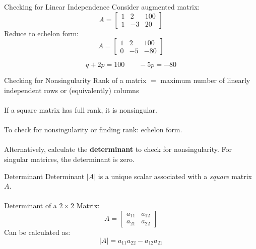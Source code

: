 \documentclass{./../../Latex/teaching_slides}
\begin{document}
\begin{frame}{Checking for Linear Independence}
Consider augmented matrix:
$$ A=\left[\begin{array}{cc|c}1 & 2 & 100 \\ 1 & -3 & 20\end{array}\right] $$
Reduce to echelon form:
$$ A=\left[\begin{array}{cc|c}1 & 2 & 100 \\ 0 & -5 & -80\end{array}\right] $$

$$ q+2p = 100 \quad \quad -5p = -80   $$
\end{frame}

\begin{frame}{Checking for Nonsingularity}
Rank of a matrix $=$ maximum number of linearly independent rows or (equivalently) columns \\~\\

If a square matrix has full rank, it is nonsingular. \\~\\

To check for nonsingularity or finding rank: echelon form. \\~\\

Alternatively, calculate the \textbf{determinant} to check for nonsingularity. For singular matrices, the determinant is zero. 
\end{frame}

 \begin{frame}{Determinant}
 Determinant $|A|$ is a unique scalar associated with a \textit{square} matrix $A$. \\~\\
 Determinant of a $2 \times 2$ Matrix:
 $$ A=\left[\begin{array}{ll}a_{11} & a_{12} \\ a_{21} & a_{22}\end{array}\right] $$
 Can be calculated as:
 $$ |A|=a_{11} a_{22}-a_{12} a_{21} $$  
 \end{frame}
 
\end{document}

